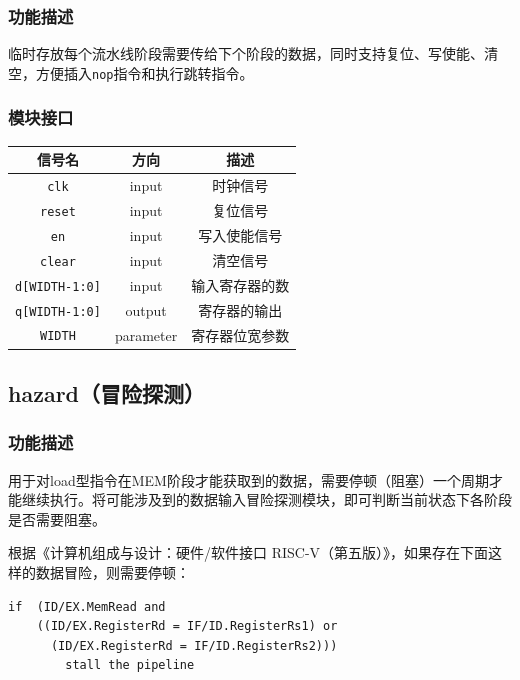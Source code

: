 \documentclass[UTF8,a4paper,autofakebold,15pt]{ctexart}
\begin{document}
\subsubsection{功能描述}

临时存放每个流水线阶段需要传给下个阶段的数据，同时支持复位、写使能、清空，方便插入{\tt nop}指令和执行跳转指令。

\subsubsection{模块接口}

\begin{center}
	\begin{tabular}{|c|c|c|}
		\hline
		信号名&方向&描述\\
		\hline
		{\tt clk}&input&时钟信号\\
		\hline
		{\tt reset}&input&复位信号\\
		\hline
		{\tt en}&input&写入使能信号\\
		\hline
		{\tt clear}&input&清空信号\\
		\hline
		{\tt d[WIDTH-1:0]}&input&输入寄存器的数\\
		\hline
		{\tt q[WIDTH-1:0]}&output&寄存器的输出\\
		\hline
		{\tt WIDTH}&parameter&寄存器位宽参数\\
		\hline
	\end{tabular}
\end{center}

\subsection{hazard（冒险探测）}

\subsubsection{功能描述}

用于对load型指令在MEM阶段才能获取到的数据，需要停顿（阻塞）一个周期才能继续执行。将可能涉及到的数据输入冒险探测模块，即可判断当前状态下各阶段是否需要阻塞。

根据《计算机组成与设计：硬件/软件接口 RISC-V（第五版）》\cite{ref1}，如果存在下面这样的数据冒险，则需要停顿：

{\lstset{language=c++}
	\begin{lstlisting}
if	(ID/EX.MemRead and
	((ID/EX.RegisterRd = IF/ID.RegisterRs1) or
	  (ID/EX.RegisterRd = IF/ID.RegisterRs2)))
	  	stall the pipeline
\end{lstlisting}}
\end{document}
